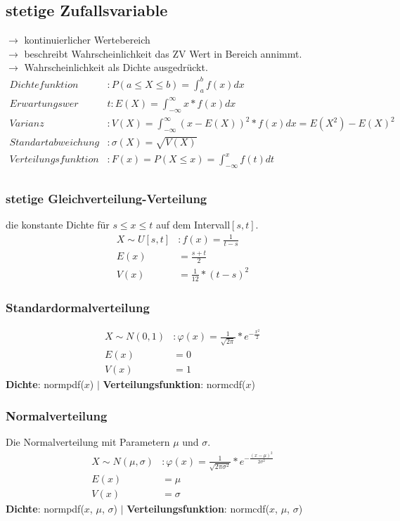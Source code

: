 \documentclass[landscape,twocolumn,a4paper]{article}
\begin{document}
\subsection*{stetige Zufallsvariable}
$\rightarrow$ kontinuierlicher Wertebereich\\
$\rightarrow$ beschreibt Wahrscheinlichkeit das ZV Wert in Bereich annimmt.\\
$\rightarrow$ Wahrscheinlichkeit als Dichte ausgedrückt.
\begin{align*}
Dichtefunktion &: P(a \leq X \leq b) = \int _a^b f(x) dx \\
Erwartungswer &t: E(X) =\int _{-\infty}^{\infty} x*f(x) dx \\
Varianz &: V(X) = \int _{-\infty}^{\infty} (x - E(X))^2 * f(x) dx = E(X^2) - E(X)^2 \\
Standartabweichung &: \sigma(X) = \sqrt{V(X)} \\
Verteilungsfunktion &: F(x) = P(X \leq x) = \int _{-\infty}^{x}f(t)dt\\
\end{align*}

\subsubsection*{stetige Gleichverteilung-Verteilung}
die konstante Dichte  für $s \leq x \leq t$ auf dem Intervall$[s,t]$. 
\begin{align*}
	X \sim U[s,t]&: f(x)=\frac{1}{t-s} \\
	E(x) &= \frac{s + t}{2}\\
	V(x) &= \frac{1}{12}*(t-s)^2
\end{align*} 

\subsubsection*{Standardormalverteilung} 
\begin{align*}
	X \sim N(0,1)&: \varphi(x) = \frac{1}{\sqrt{2\pi}}*e^{-\frac{x^2}{2}} \\
	E(x) &= 0\\
	V(x) &= 1
\end{align*} 
\textbf{Dichte}: normpdf($x$) $\mid$ \textbf{Verteilungsfunktion}: normcdf($x$)

\subsubsection*{Normalverteilung}
Die Normalverteilung mit Parametern $\mu$ und $\sigma$.
\begin{align*}
	X \sim N(\mu, \sigma) &: \varphi(x) = \frac{1}{\sqrt{2\pi\sigma^2}}*e^{-\frac{(x-\mu)^2}{2\sigma^2}}  \\
	E(x) &= \mu\\
	V(x) &= \sigma
\end{align*} 
\textbf{Dichte}: normpdf($x$, $\mu$, $\sigma$) $\mid$ \textbf{Verteilungsfunktion}: normcdf($x$, $\mu$, $\sigma$)
\end{document}
